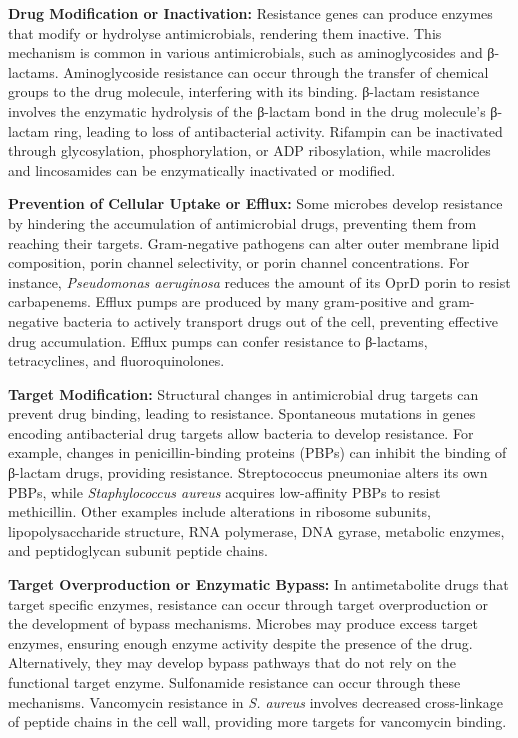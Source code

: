 \documentclass[
  letterpaper,
  DIV=11,
  numbers=noendperiod]{scrreprt}
\begin{document}
\textbf{Drug Modification or Inactivation:} Resistance genes can produce
enzymes that modify or hydrolyse antimicrobials, rendering them
inactive. This mechanism is common in various antimicrobials, such as
aminoglycosides and β-lactams. Aminoglycoside resistance can occur
through the transfer of chemical groups to the drug molecule,
interfering with its binding. β-lactam resistance involves the enzymatic
hydrolysis of the β-lactam bond in the drug molecule's β-lactam ring,
leading to loss of antibacterial activity. Rifampin can be inactivated
through glycosylation, phosphorylation, or ADP ribosylation, while
macrolides and lincosamides can be enzymatically inactivated or
modified.

\textbf{Prevention of Cellular Uptake or Efflux:} Some microbes develop
resistance by hindering the accumulation of antimicrobial drugs,
preventing them from reaching their targets. Gram-negative pathogens can
alter outer membrane lipid composition, porin channel selectivity, or
porin channel concentrations. For instance, \emph{Pseudomonas
aeruginosa} reduces the amount of its OprD porin to resist carbapenems.
Efflux pumps are produced by many gram-positive and gram-negative
bacteria to actively transport drugs out of the cell, preventing
effective drug accumulation. Efflux pumps can confer resistance to
β-lactams, tetracyclines, and fluoroquinolones.

\textbf{Target Modification:} Structural changes in antimicrobial drug
targets can prevent drug binding, leading to resistance. Spontaneous
mutations in genes encoding antibacterial drug targets allow bacteria to
develop resistance. For example, changes in penicillin-binding proteins
(PBPs) can inhibit the binding of β-lactam drugs, providing resistance.
Streptococcus pneumoniae alters its own PBPs, while \emph{Staphylococcus
aureus} acquires low-affinity PBPs to resist methicillin. Other examples
include alterations in ribosome subunits, lipopolysaccharide structure,
RNA polymerase, DNA gyrase, metabolic enzymes, and peptidoglycan subunit
peptide chains.

\textbf{Target Overproduction or Enzymatic Bypass:} In antimetabolite
drugs that target specific enzymes, resistance can occur through target
overproduction or the development of bypass mechanisms. Microbes may
produce excess target enzymes, ensuring enough enzyme activity despite
the presence of the drug. Alternatively, they may develop bypass
pathways that do not rely on the functional target enzyme. Sulfonamide
resistance can occur through these mechanisms. Vancomycin resistance in
\emph{S. aureus} involves decreased cross-linkage of peptide chains in
the cell wall, providing more targets for vancomycin binding.
\end{document}
